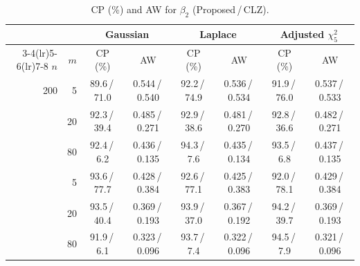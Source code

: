\begin{table}[!tbp]
\centering
\caption{CP (\%) and AW for $\beta_2$ (Proposed\,/\,CLZ).}
\label{tab:single-new}
\renewcommand{\baselinestretch}{1}\footnotesize
\setlength{\tabcolsep}{3pt}
\renewcommand{\arraystretch}{1.08}
\begin{tabular}{@{}rr*{3}{cc}@{}}
\toprule
& & \multicolumn{2}{c}{Gaussian} & \multicolumn{2}{c}{Laplace} & \multicolumn{2}{c}{Adjusted $\chi^2_5$}\\
\cmidrule(lr){3-4}\cmidrule(lr){5-6}\cmidrule(lr){7-8}
$n$ & $m$ & CP (\%) & AW & CP (\%) & AW & CP (\%) & AW\\
\midrule
200 & 5 & 89.6\,/\,71.0 & 0.544\,/\,0.540 & 92.2\,/\,74.9 & 0.536\,/\,0.534 & 91.9\,/\,76.0 & 0.537\,/\,0.533\\
 & 20 & 92.3\,/\,39.4 & 0.485\,/\,0.271 & 92.9\,/\,38.6 & 0.481\,/\,0.270 & 92.8\,/\,36.6 & 0.482\,/\,0.271\\
 & 80 & 92.4\,/\,6.2 & 0.436\,/\,0.135 & 94.3\,/\,7.6 & 0.435\,/\,0.134 & 93.5\,/\,6.8 & 0.437\,/\,0.135\\
\addlinespace[3pt]
400 & 5 & 93.6\,/\,77.7 & 0.428\,/\,0.384 & 92.6\,/\,77.1 & 0.425\,/\,0.383 & 92.0\,/\,78.1 & 0.429\,/\,0.384\\
 & 20 & 93.5\,/\,40.4 & 0.369\,/\,0.193 & 93.9\,/\,37.0 & 0.367\,/\,0.192 & 94.2\,/\,39.7 & 0.369\,/\,0.193\\
 & 80 & 91.9\,/\,6.1 & 0.323\,/\,0.096 & 93.7\,/\,7.4 & 0.322\,/\,0.096 & 94.5\,/\,7.9 & 0.321\,/\,0.096\\
\bottomrule
\end{tabular}
\end{table}
